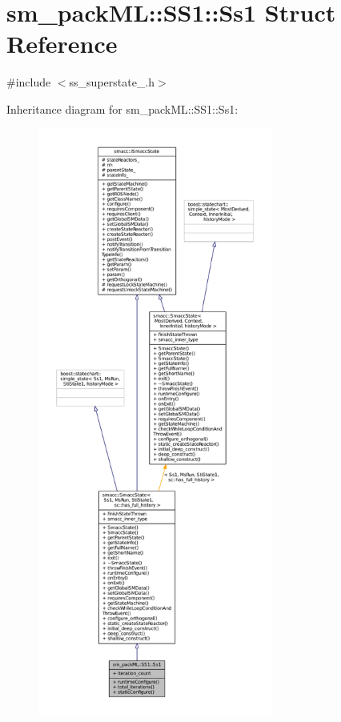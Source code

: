 \hypertarget{structsm__packML_1_1SS1_1_1Ss1}{}\section{sm\+\_\+pack\+ML\+:\+:S\+S1\+:\+:Ss1 Struct Reference}
\label{structsm__packML_1_1SS1_1_1Ss1}


{\ttfamily \#include $<$ss\+\_\+superstate\+\_.\+h$>$}



Inheritance diagram for sm\+\_\+pack\+ML\+:\+:S\+S1\+:\+:Ss1\+:
\nopagebreak
\begin{figure}[H]
\begin{center}
\leavevmode
\includegraphics[height=550pt]{structsm__packML_1_1SS1_1_1Ss1__inherit__graph}
\end{center}
\end{figure}


